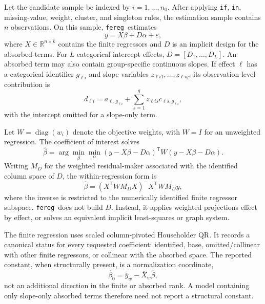 \documentclass[11pt]{article}
\newcommand{\fereg}{\texttt{fereg}}
\newcommand{\R}{\mathbb{R}}
\newcommand{\trans}{\mathsf{T}}
\begin{document}
Let the candidate sample be indexed by $i=1,\ldots,n_0$.  After applying
\texttt{if}, \texttt{in}, missing-value, weight, cluster, and singleton rules,
the estimation sample contains $n$ observations.  On this sample, \fereg\
estimates
\begin{equation}
  y = X\beta + D\alpha + \varepsilon,
  \label{eq:model}
\end{equation}
where $X\in\R^{n\times k}$ contains the finite regressors and $D$ is an
implicit design for the absorbed terms.  For $L$ categorical intercept
effects, $D=[D_1,\ldots,D_L]$.  An absorbed term may also contain
group-specific continuous slopes.  If effect $\ell$ has a categorical
identifier $g_{\ell i}$ and slope variables $z_{\ell i1},\ldots,z_{\ell iq}$,
its observation-level contribution is
\begin{equation}
  d_{\ell i} =
  a_{\ell,g_{\ell i}}+
  \sum_{s=1}^{q} z_{\ell is}c_{\ell s,g_{\ell i}},
  \label{eq:slopes}
\end{equation}
with the intercept omitted for a slope-only term.

Let $W=\operatorname{diag}(w_i)$ denote the objective weights, with
$W=I$ for an unweighted regression.  The coefficient of interest solves
\begin{equation}
  \widehat\beta
   = \arg\min_{\beta}\min_{\alpha}
       (y-X\beta-D\alpha)^\trans
       W(y-X\beta-D\alpha).
  \label{eq:wls}
\end{equation}
Writing $M_D$ for the weighted residual-maker associated with the identified
column space of $D$, the within-regression form is
\begin{equation}
  \widehat\beta
  = (X^\trans W M_D X)^{-}
    X^\trans W M_D y,
  \label{eq:fwl}
\end{equation}
where the inverse is restricted to the numerically identified finite
regressor subspace.  \fereg\ does not build $D$.  Instead, it applies
weighted projections effect by effect, or solves an equivalent implicit
least-squares or graph system.

The finite regression uses scaled column-pivoted Householder QR.  It records a
canonical status for every requested coefficient: identified, base,
omitted/collinear with other finite regressors, or collinear with the
absorbed space.  The reported constant, when structurally present, is a
normalization coordinate,
\begin{equation}
  \widehat\beta_0 =
  \overline y_w-\overline X_w\widehat\beta,
  \label{eq:constant}
\end{equation}
not an additional direction in the finite or absorbed rank.  A model
containing only slope-only absorbed terms therefore need not report a
structural constant.
\end{document}
